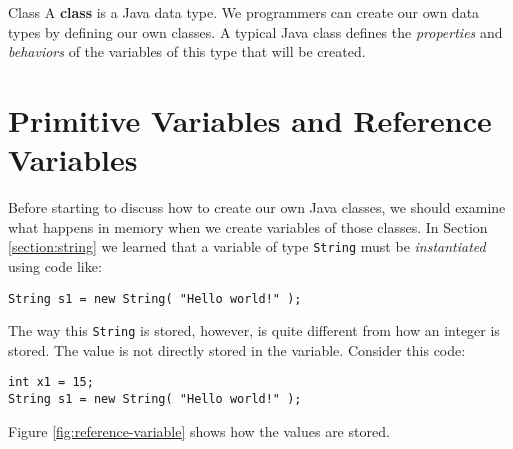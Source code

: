 \begin{defn}{Class}
    A \textbf{class} is a Java data type.  We programmers can create our own data types by defining our own classes.  A typical Java class defines the \textit{properties} and \textit{behaviors} of the variables of this type that will be created.
\end{defn}

\section{Primitive Variables and Reference Variables}

Before starting to discuss how to create our own Java classes, we should examine what happens in memory when we create variables of those classes.  In Section \ref{section:string} we learned that a variable of type \texttt{String} must be \textit{instantiated} using code like:

\begin{verbatim}
String s1 = new String( "Hello world!" );
\end{verbatim}

The way this \texttt{String} is stored, however, is quite different from how an integer is stored.  The value is not directly stored in the variable.  Consider this code:

\begin{verbatim}
int x1 = 15;
String s1 = new String( "Hello world!" );
\end{verbatim}

Figure \ref{fig:reference-variable} shows how the values are stored.


